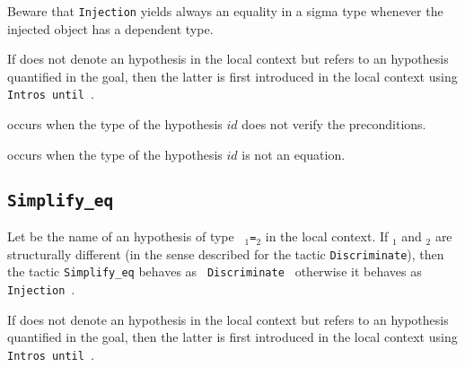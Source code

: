Beware that \texttt{Injection} yields always an equality in a sigma type
whenever the injected object has a dependent type.

\Rem If {\ident} does not denote an hypothesis in the local context
but refers to an hypothesis quantified in the goal, then the
latter is first introduced in the local context using
\texttt{Intros until \ident}.

\begin{ErrMsgs}
\item {\ident}  
  occurs when the type of
  the hypothesis $id$ does not verify the preconditions.
\item {} occurs when the type of the
  hypothesis $id$ is not an equation.
\end{ErrMsgs}


\subsection{\tt Simplify\_eq {\ident}}
\label{Simplify-eq}
Let {\ident} be the name of an hypothesis of type {\tt
  {\term$_1$}={\term$_2$}} in the local context. If {\term$_1$} and
{\term$_2$} are structurally different (in the sense described for the
tactic {\tt Discriminate}), then the tactic {\tt Simplify\_eq} behaves as {\tt
  Discriminate {\ident}} otherwise it behaves as {\tt Injection
  {\ident}}.

\Rem If {\ident} does not denote an hypothesis in the local context
but refers to an hypothesis quantified in the goal, then the
latter is first introduced in the local context using
\texttt{Intros until \ident}.

